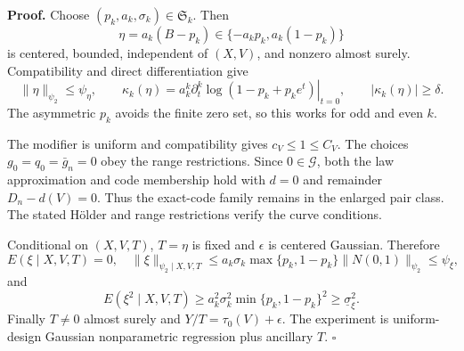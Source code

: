 \textbf{Proof.}
Choose \((p_k,a_k,\sigma_k)\in\mathfrak S_k\).  Then
\[
 \eta=a_k(B-p_k)\in\{-a_kp_k,a_k(1-p_k)\}
\]
is centered, bounded, independent of \((X,V)\), and nonzero almost surely.  Compatibility and direct differentiation give
\[
 \|\eta\|_{\psi_2}\le\psi_\eta,\qquad
 \kappa_k(\eta)=a_k^k\left.\partial_t^k\log(1-p_k+p_ke^t)\right|_{t=0},
 \qquad |\kappa_k(\eta)|\ge\delta. \tag{1}
\]
The asymmetric \(p_k\) avoids the finite zero set, so this works for odd and even \(k\).

The modifier is uniform and compatibility gives \(c_V\le1\le C_V\).  The choices \(g_0=q_0=\bar g_n=0\) obey the range restrictions.  Since \(0\in\mathcal G\), both the law approximation and code membership hold with \(d=0\) and remainder \(D_n-d(V)=0\).  Thus the exact-code family remains in the enlarged pair class.  The stated H\"older and range restrictions verify the curve conditions.

Conditional on \((X,V,T)\), \(T=\eta\) is fixed and \(\epsilon\) is centered Gaussian.  Therefore
\[
 E(\xi\mid X,V,T)=0,
 \quad \|\xi\|_{\psi_2\mid X,V,T}
 \le a_k\sigma_k\max\{p_k,1-p_k\}\|N(0,1)\|_{\psi_2}\le\psi_\xi, \tag{2}
\]
and
\[
 E(\xi^2\mid X,V,T)
 \ge a_k^2\sigma_k^2\min\{p_k,1-p_k\}^2
 \ge\underline\sigma_\xi^2. \tag{3}
\]
Finally \(T\ne0\) almost surely and \(Y/T=\tau_0(V)+\epsilon\).  The experiment is uniform-design Gaussian nonparametric regression plus ancillary \(T\). \(\square\)
